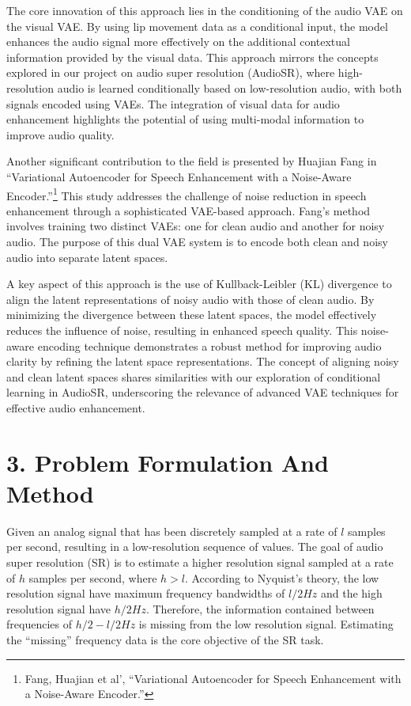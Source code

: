 \documentclass[
  ]{scrartcl}
\begin{document}
The core innovation of this approach lies in the conditioning of the
audio VAE on the visual VAE. By using lip movement data as a conditional
input, the model enhances the audio signal more effectively on the
additional contextual information provided by the visual data. This
approach mirrors the concepts explored in our project on audio super
resolution (AudioSR), where high-resolution audio is learned
conditionally based on low-resolution audio, with both signals encoded
using VAEs. The integration of visual data for audio enhancement
highlights the potential of using multi-modal information to improve
audio quality.

Another significant contribution to the field is presented by Huajian
Fang in ``Variational Autoencoder for Speech Enhancement with a
Noise-Aware Encoder.''\footnote{Fang, Huajian et al', {``Variational
  Autoencoder for Speech Enhancement with a Noise-Aware Encoder.''}}
This study addresses the challenge of noise reduction in speech
enhancement through a sophisticated VAE-based approach. Fang's method
involves training two distinct VAEs: one for clean audio and another for
noisy audio. The purpose of this dual VAE system is to encode both clean
and noisy audio into separate latent spaces.

A key aspect of this approach is the use of Kullback-Leibler (KL)
divergence to align the latent representations of noisy audio with those
of clean audio. By minimizing the divergence between these latent
spaces, the model effectively reduces the influence of noise, resulting
in enhanced speech quality. This noise-aware encoding technique
demonstrates a robust method for improving audio clarity by refining the
latent space representations. The concept of aligning noisy and clean
latent spaces shares similarities with our exploration of conditional
learning in AudioSR, underscoring the relevance of advanced VAE
techniques for effective audio enhancement.

\section{3. Problem Formulation And
Method}\label{problem-formulation-and-method}

Given an analog signal that has been discretely sampled at a rate of
\(l\) samples per second, resulting in a low-resolution sequence of
values. The goal of audio super resolution (SR) is to estimate a higher
resolution signal sampled at a rate of \(h\) samples per second, where
\(h > l\). According to Nyquist's theory, the low resolution signal have
maximum frequency bandwidths of \(l/2 Hz\) and the high resolution
signal have \(h/2 Hz\). Therefore, the information contained between
frequencies of \(h/2 − l/2 Hz\) is missing from the low resolution
signal. Estimating the ``missing'' frequency data is the core objective
of the SR task.
\end{document}
